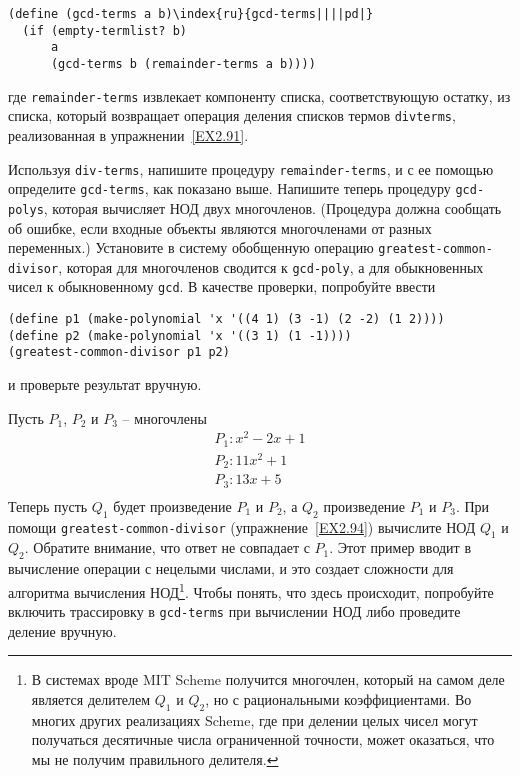 \begin{Verbatim}[fontsize=\small]
(define (gcd-terms a b)\index{ru}{gcd-terms||||pd|}
  (if (empty-termlist? b)
      a
      (gcd-terms b (remainder-terms a b))))
\end{Verbatim}
где {\tt remainder-terms} извлекает компоненту списка,
соответствующую остатку, из списка, который возвращает операция деления
списков термов {\tt div\-terms}, реализованная в 
упражнении~\ref{EX2.91}.
\begin{exercise}{2.94}\label{EX2.94}%
Используя {\tt div-terms}, напишите процедуру
 {\tt remainder-terms}, и с ее помощью определите
{\tt gcd-terms}, как показано выше.  Напишите теперь процедуру
{\tt gcd-polys}, которая вычисляет  НОД двух многочленов.
(Процедура должна сообщать об ошибке, если входные объекты являются многочленами от разных переменных.)  Установите в систему обобщенную операцию
{\tt greatest-common-divisor}, которая для многочленов сводится
к {\tt gcd-poly}, а для обыкновенных чисел к обыкновенному
{\tt gcd}.  В качестве проверки, попробуйте ввести

\begin{Verbatim}[fontsize=\small]
(define p1 (make-polynomial 'x '((4 1) (3 -1) (2 -2) (1 2))))
(define p2 (make-polynomial 'x '((3 1) (1 -1))))
(greatest-common-divisor p1 p2)
\end{Verbatim}
и проверьте результат вручную.
\end{exercise}
\begin{exercise}{2.95}\label{EX2.95}%
Пусть $P_1$,
$P_2$ и $P_3$ --
многочлены
$$
\begin{array}{l}
P_1: x^2 - 2x + 1\\
P_2: 11x^2 + 1\\
P_3: 13x + 5\\
\end{array}
$$
Теперь пусть 
$Q_1$ будет произведение
$P_1$ и $P_2$,
а $Q_2$ произведение
$P_1$ и $P_3$.
При помощи {\tt greatest-common-divisor} 
(упражнение~\ref{EX2.94}) вычислите НОД
$Q_1$ и $Q_2$.
Обратите внимание, что ответ не совпадает с 
$P_1$.  Этот пример вводит в вычисление операции
с нецелыми числами, и это создает сложности для алгоритма вычисления
НОД\footnote{В системах вроде MIT Scheme получится многочлен,
который на самом деле является делителем $Q_1$ и
$Q_2$, но с рациональными коэффициентами.  Во
многих других реализациях Scheme, где при делении целых чисел могут
получаться десятичные числа ограниченной точности, может оказаться,
что мы не получим правильного делителя.}.
Чтобы понять, что здесь происходит, попробуйте
включить трассировку в {\tt gcd-terms} при вычислении НОД либо
проведите деление вручную.
\end{exercise}

